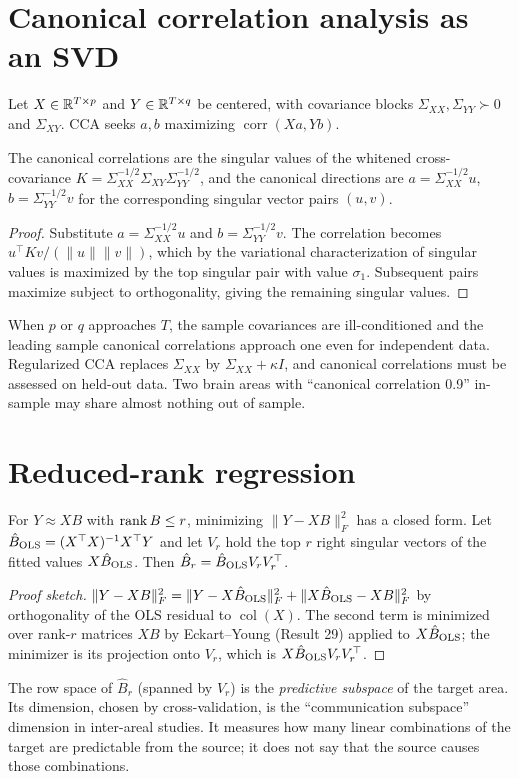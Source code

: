 \section{Canonical correlation analysis as an SVD}
Let $X\in\mathbb{R}^{T\times p}$ and $Y\in\mathbb{R}^{T\times q}$ be centered, with
covariance blocks $\Sigma_{XX},\Sigma_{YY}\succ0$ and $\Sigma_{XY}$.
CCA seeks $a,b$ maximizing $\operatorname{corr}(Xa,Yb)$.
\begin{proposition}
The canonical correlations are the singular values of the whitened
cross-covariance $K=\Sigma_{XX}^{-1/2}\Sigma_{XY}\Sigma_{YY}^{-1/2}$, and the
canonical directions are $a=\Sigma_{XX}^{-1/2}u$, $b=\Sigma_{YY}^{-1/2}v$ for
the corresponding singular vector pairs $(u,v)$.
\end{proposition}
\begin{proof}
Substitute $a=\Sigma_{XX}^{-1/2}u$ and $b=\Sigma_{YY}^{-1/2}v$. The
correlation becomes $u^\top Kv/(\|u\|\|v\|)$, which by the variational
characterization of singular values is maximized by the top singular
pair with value $\sigma_1$. Subsequent pairs maximize subject to
orthogonality, giving the remaining singular values.
\end{proof}
When $p$ or $q$ approaches $T$, the sample covariances are
ill-conditioned and the leading sample canonical correlations approach
one even for independent data. Regularized CCA replaces
$\Sigma_{XX}$ by $\Sigma_{XX}+\kappa I$, and canonical correlations must be
assessed on held-out data. Two brain areas with ``canonical correlation
0.9'' in-sample may share almost nothing out of sample.

\section{Reduced-rank regression}
For $Y\approx XB$ with $\operatorname{rank} B\le r$, minimizing
$\|Y-XB\|_F^2$ has a closed form. Let $\hat B_{\rm OLS}=(X^\top X)^{-1}X^\top Y$
and let $V_r$ hold the top $r$ right singular vectors of the fitted values
$X\hat B_{\rm OLS}$. Then $\hat B_r=\hat B_{\rm OLS}V_rV_r^\top$.
\begin{proof}[Proof sketch]
$\|Y-XB\|_F^2=\|Y-X\hat B_{\rm OLS}\|_F^2+\|X\hat B_{\rm OLS}-XB\|_F^2$ by
orthogonality of the OLS residual to $\operatorname{col}(X)$. The second
term is minimized over rank-$r$ matrices $XB$ by Eckart--Young
(Result 29) applied to $X\hat B_{\rm OLS}$; the minimizer is its
projection onto $V_r$, which is $X\hat B_{\rm OLS}V_rV_r^\top$.
\end{proof}
The row space of $\hat B_r$ (spanned by $V_r$) is the \emph{predictive
subspace} of the target area. Its dimension, chosen by cross-validation,
is the ``communication subspace'' dimension in inter-areal studies. It
measures how many linear combinations of the target are predictable from
the source; it does not say that the source causes those combinations.

